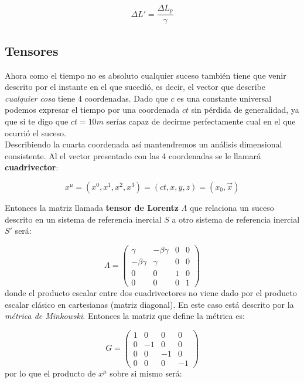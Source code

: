 \documentclass[12pt,a4paper]{article}
\numberwithin{equation}{section}
\numberwithin{figure}{section}
\begin{document}
\begin{equation}
\Delta L' = \frac{\Delta L_p}{\gamma}
\end{equation}

\subsection{Tensores}

Ahora como el tiempo no es absoluto cualquier suceso también tiene que venir descrito por el instante en el que sucedió, es decir, el vector que describe \textit{cualquier cosa} tiene 4 coordenadas. Dado que $c$ es una constante universal podemos expresar el tiempo por una coordenada $c t$ sin pérdida de generalidad, ya que si te digo que $c t = 10 m$ serías capaz de decirme perfectamente cual en el que ocurrió el suceso. \\

 Describiendo la cuarta coordenada así mantendremos un análisis dimensional consistente. Al el vector presentado con las 4 coordenadas se le llamará \textbf{cuadrivector}:

\begin{equation}
x^\mu = (x^0,x^1,x^2,x^3) = (ct,x,y,z) = (x_0, \vec{x})
\end{equation}

Entonces la matriz llamada \textbf{tensor de Lorentz} $\Lambda$ que relaciona un suceso descrito en un sistema de referencia inercial $S$ a otro sistema de referencia inercial $S'$ será:

\begin{equation}
\Lambda = 
\begin{pmatrix}
\gamma &
- \beta \gamma &
0 & 0 \\ 
- \beta \gamma &
\gamma &
0 & 0\\ 
0  &
0  &
1 & 0 \\
0 & 0 & 0 & 1
\end{pmatrix}
\end{equation}
donde el producto escalar entre dos cuadrivectores no viene dado por el producto escalar clásico en cartesianas (matriz diagonal). En este caso está descrito por la \textit{métrica de Minkowski}. Entonces la matriz que define la métrica es:

\begin{equation}
G = \begin{pmatrix}
1 &
0 & 
0 & 
0 \\
0 & 
-1 &
0 & 
0 \\ 
0 &
0 & 
-1 &
0 \\ 
0 & 
0 & 
0 & 
-1 
\end{pmatrix}
\end{equation}
por lo que el producto de $x^\mu$ sobre si mismo será:
\end{document}
